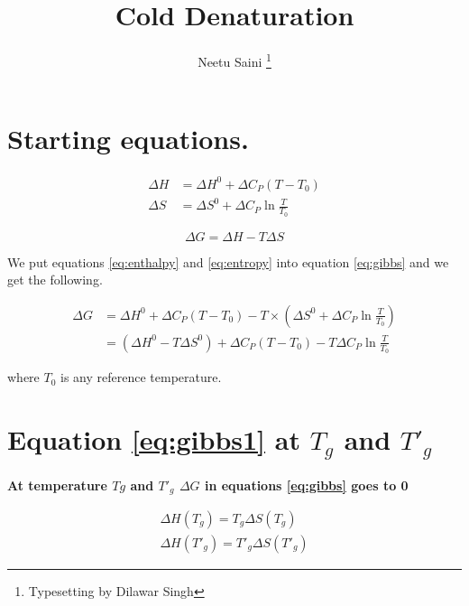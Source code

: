 \documentclass[]{article}
\title{Cold Denaturation}
\author{Neetu Saini \footnote{Typesetting by Dilawar Singh}}
\date{}
\begin{document}
\maketitle

\section{Starting equations.}\label{starting-equations.}

\begin{subequations}
    \begin{align}
        \Delta H &= \Delta H^0 + \Delta C_P (T - T_0) \label{eq:enthalpy} \\
        \Delta S &= \Delta S^0 + \Delta C_P \ln{\frac{T}{T_0}} \label{eq:entropy}
    \end{align}
\end{subequations}

\begin{equation}
    \Delta G = \Delta H - T \Delta S \label{eq:gibbs}
\end{equation}

We put equations \ref{eq:enthalpy} and \ref{eq:entropy} into equation
\ref{eq:gibbs} and we get the following.

\begin{align}
    \Delta G &= \Delta H^0 + \Delta C_P (T - T_0) - T \times \left(\Delta S^0 + \Delta C_P \ln{\frac{T}{T_0}}\right) \\
     &= \left(\Delta H^0 - T\Delta S^0 \right) + \Delta C_P (T - T_0) - T \Delta C_P \ln{\frac{T}{T_0}} \label{eq:gibbs1}
\end{align}

where $T_0$ is any reference temperature.

\section{Equation \ref{eq:gibbs1} at $T_g$ and
$T'_g$}\label{equation-at-tux5fg-and-tux5fg}

\textbf{At temperature $Tg$ and $T'_g$ $\Delta G$ in equations
\ref{eq:gibbs} goes to 0}

\begin{subequations}
    \label{eq:subequation}
    \begin{align}
        \Delta H(T_g) = T_g \Delta S(T_g) \label{eq:enthalpy0} \\
        \Delta H(T'_g) = T'_g \Delta S(T'_g) \label{eq:enthalpy1} 
    \end{align}
\end{subequations}
\end{document}
